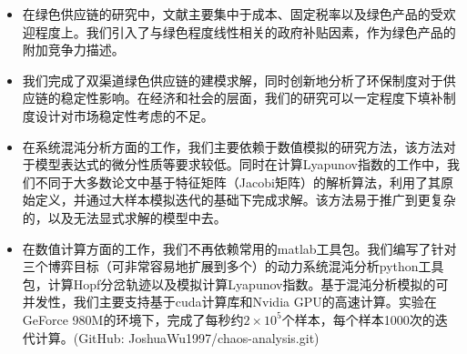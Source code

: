 \documentclass{article}
\begin{document}
\begin{itemize}
    \item 在绿色供应链的研究中，文献主要集中于成本、固定税率以及绿色产品的受欢迎程度上。我们引入了与绿色程度线性相关的政府补贴因素，作为绿色产品的附加竞争力描述。
    \item 我们完成了双渠道绿色供应链的建模求解，同时创新地分析了环保制度对于供应链的稳定性影响。在经济和社会的层面，我们的研究可以一定程度下填补制度设计对市场稳定性考虑的不足。
    \item 在系统混沌分析方面的工作，我们主要依赖于数值模拟的研究方法，该方法对于模型表达式的微分性质等要求较低。同时在计算Lyapunov指数的工作中，我们不同于大多数论文中基于特征矩阵（Jacobi矩阵）的解析算法，利用了其原始定义，并通过大样本模拟迭代的基础下完成求解。该方法易于推广到更复杂的，以及无法显式求解的模型中去。
    \item 在数值计算方面的工作，我们不再依赖常用的matlab工具包。我们编写了针对三个博弈目标（可非常容易地扩展到多个）的动力系统混沌分析python工具包，计算Hopf分岔轨迹以及模拟计算Lyapunov指数。基于混沌分析模拟的可并发性，我们主要支持基于cuda计算库和Nvidia GPU的高速计算。实验在GeForce 980M的环境下，完成了每秒约$2\times10^5$个样本，每个样本1000次的迭代计算。(GitHub: JoshuaWu1997/chaos-analysis.git)
\end{itemize}
\end{document}
